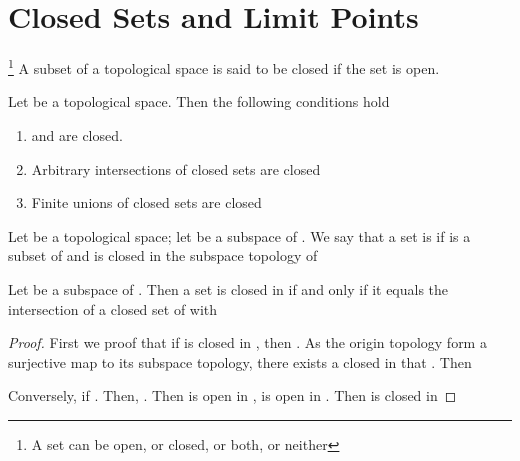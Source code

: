 \section{Closed Sets and Limit Points}

\begin{definition}[closed]\label{def:Closed}\footnote{
      A set can be open, or closed, or both, or neither
}
      A subset  of a topological space is said to be closed if the set  is open.
\end{definition}

\begin{theorem}\omitObviuos
      Let  be a topological space. Then the following conditions hold
      \begin{enumerate}
            \item \mt{\emptyset} and  are closed.
            \item Arbitrary intersections of closed sets are closed
            \item Finite unions of closed sets are closed 
      \end{enumerate}
\end{theorem}

\begin{definition}[closed in]\label{def:ClosedIn}
      Let  be a topological space; let  be a subspace of . We say that a set  is   if  is a subset of  and  is closed in the subspace topology of 
\end{definition}

\begin{theorem}
      Let  be a subspace of . Then a set  is closed in  if and only if it equals the intersection of a closed set of  with 
\end{theorem}

\begin{proof}
      First we proof that if  is closed in , then . As the origin topology form a surjective map to its subspace topology, there exists a  closed in  that . Then 

      Conversely, if . Then, . Then  is open in ,  is open in . Then  is closed in 
\end{proof}

